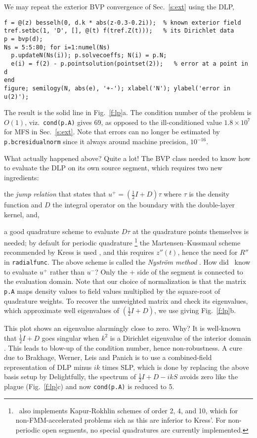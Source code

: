 We may repeat the exterior BVP convergence of Sec.~\ref{s:ext} using the DLP,
\begin{verbatim}
f = @(z) besselh(0, d.k * abs(z-0.3-0.2i));  % known exterior field
tref.setbc(1, 'D', [], @(t) f(tref.Z(t)));   % its Dirichlet data
p = bvp(d);
Ns = 5:5:80; for i=1:numel(Ns)
  p.updateN(Ns(i)); p.solvecoeffs; N(i) = p.N;
  e(i) = f(2) - p.pointsolution(pointset(2));   % error at a point in d
end
figure; semilogy(N, abs(e), '+-'); xlabel('N'); ylabel('error in u(2)');
\end{verbatim}
The result is the solid line in Fig.~\ref{f:lp}a.
The condition number of the problem is $O(1)$, viz.\ {\tt cond(p.A)} gives
69, as opposed to the ill-conditioned value
$1.8\times 10^7$ for MFS in Sec.~\ref{s:ext}.
Note that errors can no longer be estimated by {\tt p.bcresidualnorm} since it
always around machine precision, $10^{-16}$.

What actually happened above? Quite a lot! The BVP class needed to know how
to evaluate the DLP on its own source segment, which requires two new
ingredients:
\ben
\item the {\em jump relation} that states that
$u^+ = (\frac{1}{2}I + D)\tau$ where $\tau$ is the density function and
$D$ the integral operator on the boundary with the double-layer kernel, and,
\item a good quadrature scheme to evaluate $D\tau$ at the quadrature points
themselves is needed; by default for periodic quadrature%
  \footnote{\mpspack\ also implements Kapur-Rokhlin schemes of order 2, 4,
    and 10, which for non-FMM-accelerated problems sich as this are inferior
    to Kress'. For non-periodic open segments, no special quadratures are
    currently implemented.}
the Martensen--Kussmaul scheme recommended by Kress is used \cite{coltonkress},
and this requires $z''(t)$, hence the need for $R''$ in {\tt radialfunc}.
\een
The above scheme is called the {\em Nystr\"{o}m method} \cite{coltonkress}.
How did \mpspack\ know to evaluate $u^+$ rather than $u^-$? Only the
$+$ side of the segment is connected to the evaluation domain.
Note that our choice of normalization is that the matrix
{\tt p.A} maps density values to field values multiplied by the square-root
of quadrature weights. To recover the unweighted matrix and check its
eigenvalues, which approximate well eigenvalues of $(\frac{1}{2}I + D)$,
we use
giving Fig.~\ref{f:lp}b.

This plot shows an eigenvalue alarmingly close to zero. Why?
It is well-known that $\frac{1}{2}I + D$ goes singular when $k^2$ is
a Dirichlet eigenvalue of the interior domain \cite{coltonkress}.
This leads to blow-up of the condition number, hence non-robustness.
A cure due to Brakhage, Werner, Leis and Panich \cite{coltonkress}
is to use a combined-field representation of DLP minus $ik$ times SLP,
which is done by replacing the above basis setup by
Delightfully, the spectrum of $\frac{1}{2}I + D - ikS$ avoids
zero like the plague (Fig.~\ref{f:lp}c) and now {\tt cond(p.A)} is reduced to 5.

